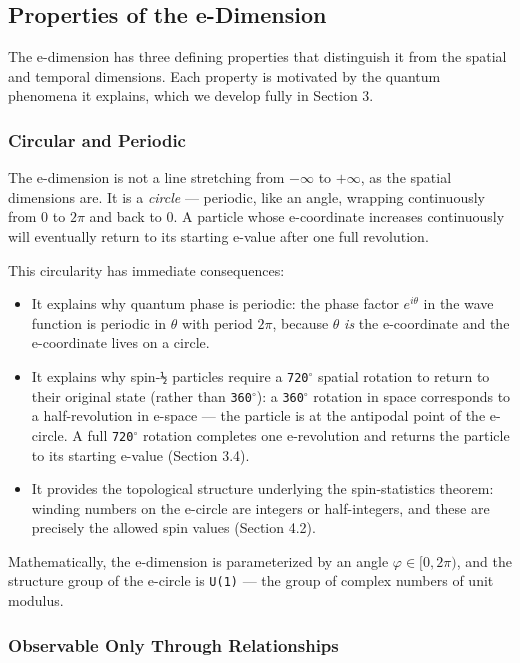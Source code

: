 \documentclass[aps,prd,preprint,superscriptaddress,longbibliography,floatfix]{revtex4-2}
\theoremstyle{remark}
\begin{document}
\subsection{Properties of the e-Dimension}

The e-dimension has three defining properties that distinguish it from the spatial and temporal dimensions. Each property is motivated by the quantum phenomena it explains, which we develop fully in Section 3.


\subsubsection{Circular and Periodic}

The e-dimension is not a line stretching from $-\infty$ to $+\infty$, as the spatial dimensions are. It is a \textit{circle} --- periodic, like an angle, wrapping continuously from 0 to $2\pi$ and back to 0. A particle whose e-coordinate increases continuously will eventually return to its starting e-value after one full revolution.

This circularity has immediate consequences:


\begin{itemize}
  \item It explains why quantum phase is periodic: the phase factor $e^{i\theta}$ in the wave function is periodic in $\theta$ with period $2\pi$, because $\theta$ \textit{is} the e-coordinate and the e-coordinate lives on a circle.
  \item It explains why spin-\texttt{½} particles require a \texttt{720$^{\circ}$} spatial rotation to return to their original state (rather than \texttt{360$^{\circ}$}): a \texttt{360$^{\circ}$} rotation in space corresponds to a half-revolution in e-space --- the particle is at the antipodal point of the e-circle. A full \texttt{720$^{\circ}$} rotation completes one e-revolution and returns the particle to its starting e-value (Section 3.4).
  \item It provides the topological structure underlying the spin-statistics theorem: winding numbers on the e-circle are integers or half-integers, and these are precisely the allowed spin values (Section 4.2).
\end{itemize}

Mathematically, the e-dimension is parameterized by an angle $\varphi \in [0, 2\pi)$, and the structure group of the e-circle is \texttt{U(1)} --- the group of complex numbers of unit modulus.


\subsubsection{Observable Only Through Relationships}
\end{document}
